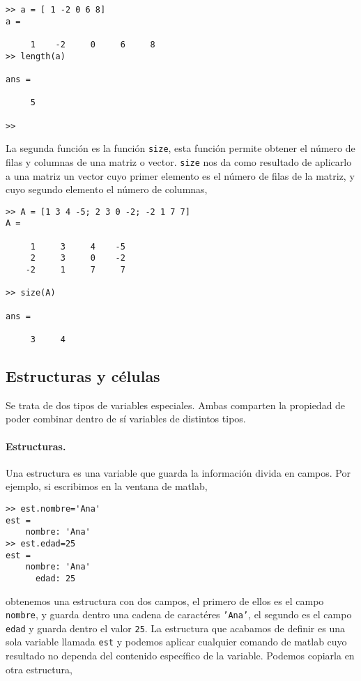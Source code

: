 \begin{verbatim}
>> a = [ 1 -2 0 6 8]
a =

     1    -2     0     6     8
>> length(a)

ans =

     5

>> 
\end{verbatim} 

La segunda función es la función \texttt{size}, esta función permite obtener el número de filas y columnas de una matriz o vector. \texttt{size} nos da como resultado de aplicarlo a una matriz un vector cuyo primer elemento es el número de filas de la matriz, y cuyo segundo elemento el número de columnas,

\begin{verbatim}
>> A = [1 3 4 -5; 2 3 0 -2; -2 1 7 7]
A =

     1     3     4    -5
     2     3     0    -2
    -2     1     7     7

>> size(A)

ans =

     3     4
\end{verbatim}  


\subsection{Estructuras y células}
Se trata de dos tipos de variables especiales. Ambas comparten la propiedad de poder combinar dentro de sí variables de distintos tipos.

\paragraph*{Estructuras.} Una estructura es una variable que guarda la información divida en campos. Por ejemplo, si escribimos en la ventana de matlab,

\begin{verbatim}
>> est.nombre='Ana'
est = 
    nombre: 'Ana'
>> est.edad=25
est = 
    nombre: 'Ana'
      edad: 25
\end{verbatim}

obtenemos una estructura con dos campos, el primero de ellos es el campo \texttt{nombre}, y guarda dentro una cadena de caractéres \texttt{'Ana'}, el segundo es el campo \texttt{edad} y guarda dentro el valor \texttt{25}. La estructura que acabamos de definir es una sola variable llamada \texttt{est} y podemos aplicar cualquier comando de matlab cuyo resultado no dependa del contenido específico de la variable. Podemos copiarla en otra estructura,

